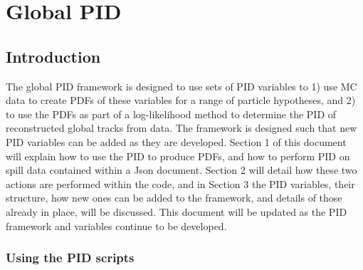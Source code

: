 \chapter{Global PID}
\label{chapter:globalpid}

\section{Introduction}
\label{intro}

The global PID framework is designed to use sets of PID variables to 1) use MC data to create PDFs of these variables for a range of particle hypotheses, and 2) to use the PDFs as part of a log-likelihood method to determine the PID of reconstructed global tracks from data. The framework is designed such that new PID variables can be added as they are developed. Section 1 of this document will explain how to use the PID to produce PDFs, and how to perform PID on spill data contained within a Json document. Section 2 will detail how these two actions are performed within the code, and in Section 3 the PID variables, their structure, how new ones can be added to the framework, and details of those already in place, will be discussed. This document will be updated as the PID framework and variables continue to be developed.

\subsection{Using the PID scripts}
\label{use}

